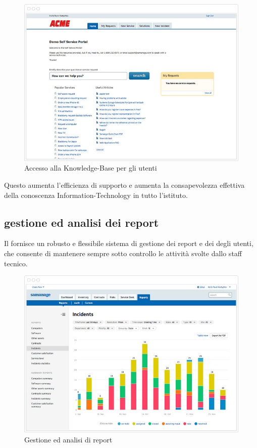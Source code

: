 \begin{figure}[htbp]
\centering
\includegraphics[scale=0.6]{Images/samanage/Knowledge_base_self_service.png}
\caption{Accesso alla \ac{Knowledge-Base} per gli utenti}
\label{sd-samanage-knowledge-base-img-2}
\end{figure}

Questo aumenta l'efficienza di supporto e aumenta la consapevolezza effettiva della conoscenza \acs{Information-Technology} in tutto l'istituto.

\subsection[Gestione ed analisi dei report]{gestione ed analisi dei report}
\label{sd-samanage-report-management}
Il  fornisce un robusto e flessibile sistema di gestione dei report e dei  degli utenti, che consente di mantenere sempre sotto controllo le attività svolte dallo staff tecnico.

\begin{figure}[htbp]
\centering
\includegraphics[scale=0.6]{Images/samanage/Report_management.png}
\caption{Gestione ed analisi di report}
\label{sd-samanage-report-management-img}
\end{figure}

